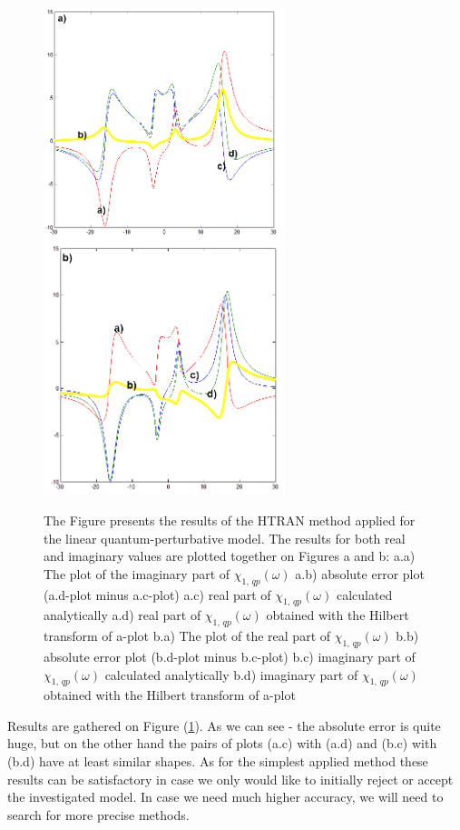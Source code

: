 \documentclass[12pt,twoside,a4paper]{article}
\numberwithin{equation}{subsection}
\numberwithin{figure}{subsection}
\begin{document}
\begin{figure} 
  \includegraphics[width=70mm]{img/htran_qp_2da.png} 
  \includegraphics[width=70mm]{img/htran_qp_2db.png}  
  \caption{The Figure presents the results of the HTRAN method applied for the linear quantum-perturbative model. The results for both real and imaginary values are plotted together on Figures a and b:
  a.a) The plot of the imaginary part of ${\chi_{1, \, qp}}(\omega )$ 
  a.b) absolute error plot (a.d-plot minus a.c-plot) 
  a.c) real part of ${\chi_{1, \, qp}}(\omega )$ calculated analytically
  a.d) real part of ${\chi_{1, \, qp}}(\omega )$ obtained with the Hilbert transform of a-plot
  b.a) The plot of the real part of ${\chi_{1, \, qp}}(\omega )$
  b.b) absolute error plot (b.d-plot minus b.c-plot)  
  b.c) imaginary part of ${\chi_{1, \, qp}}(\omega )$ calculated analytically 
  b.d) imaginary part of ${\chi_{1, \, qp}}(\omega )$ obtained with the Hilbert transform of a-plot 
  \label{fig:htran_qp_2d}}
\end{figure}

Results are gathered on Figure (\ref{fig:htran_qp_2d}). As we can see - the absolute error is quite huge, but on the other hand the pairs of plots (a.c) with (a.d) and (b.c) with (b.d) have at least similar shapes. As for the simplest applied method these results can be satisfactory in case we only would like to initially reject or accept the investigated model. In case we need much higher accuracy, we will need to search for more precise methods.
\end{document}

